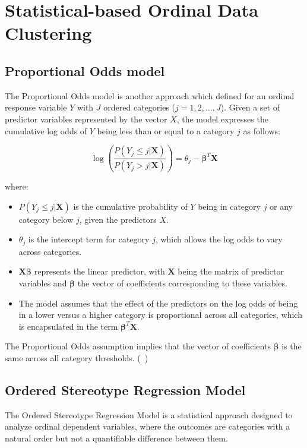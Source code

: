 \documentclass{article}
\begin{document}
\section{Statistical-based Ordinal Data Clustering}

\subsection{Proportional Odds model}

The Proportional Odds model is another approach which defined for an ordinal response variable $Y$ with $J$ ordered categories ($j=1, 2, \ldots, J$). 
Given a set of predictor variables represented by the vector $X$, the model expresses the cumulative log odds of $Y$ being less than or equal to a category $j$ as follows:

\[
\log\left(\frac{P(Y_j \leq j | \mathbf{X})}{P(Y_j > j | \mathbf{X})}\right) = \theta_j - \boldsymbol{\beta}^T\mathbf{X}
\]

where:
\begin{itemize}
    \item $P(Y_j \leq j | \mathbf{X})$ is the cumulative probability of $Y$ being in category $j$ or any category below $j$, given the predictors $X$.
    \item $\theta_j$ is the intercept term for category $j$, which allows the log odds to vary across categories.
    \item $\mathbf{X}\boldsymbol{\beta}$ represents the linear predictor, with $\mathbf{X}$ being the matrix of predictor variables and $\boldsymbol{\beta}$ the vector of coefficients corresponding to these variables.
    \item The model assumes that the effect of the predictors on the log odds of being in a lower versus a higher category is proportional across all categories, which is encapsulated in the term $\boldsymbol{\beta}^T\mathbf{X}$.
\end{itemize}

The Proportional Odds assumption implies that the vector of coefficients $\boldsymbol{\beta}$ is the same across all category thresholds. (~\cite{mccullagh1980regression})

\subsection{Ordered Stereotype Regression Model}

The Ordered Stereotype Regression Model is a statistical approach designed to analyze ordinal dependent variables, where the outcomes are categories with a natural order but not a quantifiable difference between them.
\end{document}
